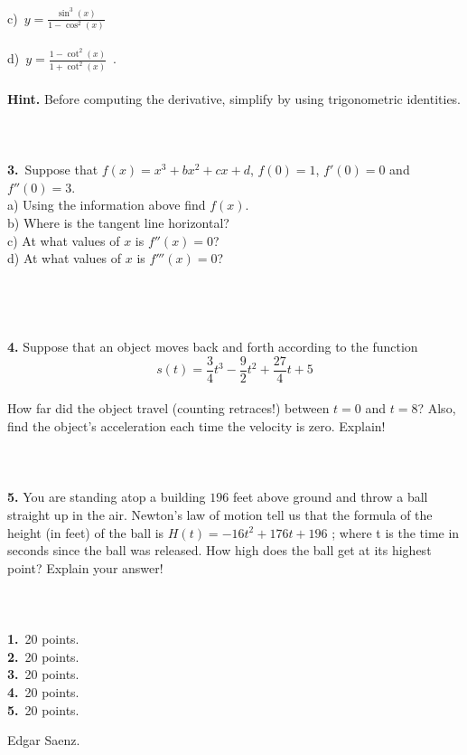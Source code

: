 \documentclass[12pt]{article}
\newcommand{\Frac}{\displaystyle \frac}
\begin{document}
\\
c)\ $y= \Frac{\sin^{3}(x)}{1-\cos^{2}(x)}$\\
\\
d)\ $y= \Frac{1-\cot^{2}(x)}{1+\cot^{2}(x)}$\ .\\
\\
\textbf{Hint.} Before computing the derivative, simplify by using
trigonometric identities.\\\\\\\\
\textbf{3.}\ Suppose that $f(x)=x^{3}+bx^{2}+cx+d$, $f(0)=1$,
$f'(0)=0$ and $f''(0)=3$.
\\
a) Using the information above find $f(x)$.\\
b) Where is the tangent line horizontal?\\
c) At what values of $x$ is $f''(x)=0$?\\
d) At what values of $x$ is $f'''(x)=0$?\\
\\\\\\\\
\textbf{4.} Suppose that an object moves back and forth according to
the function
$$s(t)=\Frac{3}{4}t^{3}-\Frac{9}{2}t^{2}+\Frac{27}{4}t+5$$\\
How far did the object travel (counting retraces!) between $t=0$ and
$t=8$? Also, find the object's acceleration each time the velocity
is zero.
Explain!\\
\\
\\
\\
\textbf{5.} You are standing atop a building $196$ feet above ground
and throw a ball straight up in the air. Newton's law of motion tell
us that the formula of the height (in feet) of the ball is $H(t) =
-16t^{2} + 176t + 196$ ; where t is the time in seconds since the
ball was released. How high does the ball get at its highest point?
Explain your answer!\\
\\
\\
\\
\textbf{1.}\ 20 points.\\
\textbf{2.}\ 20 points.\\
\textbf{3.}\ 20 points.\\
\textbf{4.}\ 20 points.\\
\textbf{5.}\ 20 points.\\
\begin{flushright}
Edgar Saenz.
\end{flushright}
\end{document}
